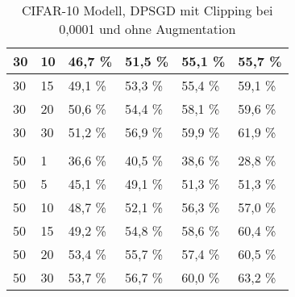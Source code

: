 \begin{table}[!htb]
\begin{tabular}{llllll}
\multicolumn{1}{|l|}{30}  & \multicolumn{1}{l|}{10}  & \multicolumn{1}{l|}{46,7 \%} & \multicolumn{1}{l|}{51,5 \%} & \multicolumn{1}{l|}{55,1 \%} & \multicolumn{1}{l|}{55,7 \%} \\ \hline
\multicolumn{1}{|l|}{30}  & \multicolumn{1}{l|}{15}  & \multicolumn{1}{l|}{49,1 \%} & \multicolumn{1}{l|}{53,3 \%} & \multicolumn{1}{l|}{55,4 \%} & \multicolumn{1}{l|}{59,1 \%} \\ \hline
\multicolumn{1}{|l|}{30}  & \multicolumn{1}{l|}{20}  & \multicolumn{1}{l|}{50,6 \%} & \multicolumn{1}{l|}{54,4 \%} & \multicolumn{1}{l|}{58,1 \%} & \multicolumn{1}{l|}{59,6 \%} \\ \hline
\multicolumn{1}{|l|}{30}  & \multicolumn{1}{l|}{30}  & \multicolumn{1}{l|}{51,2 \%} & \multicolumn{1}{l|}{56,9 \%} & \multicolumn{1}{l|}{59,9 \%} & \multicolumn{1}{l|}{61,9 \%} \\ \hline
 &  & & & & \\ \hline
\multicolumn{1}{|l|}{50}  & \multicolumn{1}{l|}{1} & \multicolumn{1}{l|}{36,6 \%} & \multicolumn{1}{l|}{40,5 \%} & \multicolumn{1}{l|}{38,6 \%} & \multicolumn{1}{l|}{28,8 \%} \\ \hline
\multicolumn{1}{|l|}{50}  & \multicolumn{1}{l|}{5} & \multicolumn{1}{l|}{45,1 \%} & \multicolumn{1}{l|}{49,1 \%} & \multicolumn{1}{l|}{51,3 \%} & \multicolumn{1}{l|}{51,3 \%} \\ \hline
\multicolumn{1}{|l|}{50}  & \multicolumn{1}{l|}{10}  & \multicolumn{1}{l|}{48,7 \%} & \multicolumn{1}{l|}{52,1 \%} & \multicolumn{1}{l|}{56,3 \%} & \multicolumn{1}{l|}{57,0 \%} \\ \hline
\multicolumn{1}{|l|}{50}  & \multicolumn{1}{l|}{15}  & \multicolumn{1}{l|}{49,2 \%} & \multicolumn{1}{l|}{54,8 \%} & \multicolumn{1}{l|}{58,6 \%} & \multicolumn{1}{l|}{60,4 \%} \\ \hline
\multicolumn{1}{|l|}{50}  & \multicolumn{1}{l|}{20}  & \multicolumn{1}{l|}{53,4 \%} & \multicolumn{1}{l|}{55,7 \%} & \multicolumn{1}{l|}{57,4 \%} & \multicolumn{1}{l|}{60,5 \%} \\ \hline
\multicolumn{1}{|l|}{50}  & \multicolumn{1}{l|}{30}  & \multicolumn{1}{l|}{53,7 \%} & \multicolumn{1}{l|}{56,7 \%} & \multicolumn{1}{l|}{60,0 \%} & \multicolumn{1}{l|}{63,2 \%} \\ \hline
\end{tabular}
\caption{CIFAR-10 Modell, DPSGD mit Clipping bei 0,0001 und ohne Augmentation}
\label{tab:c10_exp3}
\end{table}